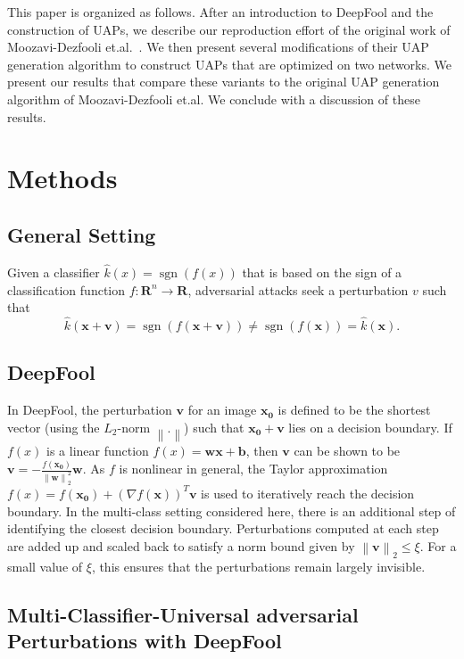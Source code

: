 \documentclass[runningheads]{llncs}
\DeclareMathOperator{\sgn}{sgn}
\newcommand{\xn}{\ensuremath{\mathbf{x_0}}}
\begin{document}
This paper is organized as follows. After an introduction to DeepFool and the construction of UAPs, we describe our reproduction effort of the original work of Moozavi-Dezfooli et.al.~\cite{moosavi-dezfooli_universal_2017}. We then present several modifications of their UAP generation algorithm to construct UAPs that are optimized on two networks. We present our results that compare these variants to the original UAP generation algorithm of Moozavi-Dezfooli et.al. We conclude with a discussion of these results.

\section{Methods}
\subsection{General Setting}
Given a classifier $\hat{k}(x)=\sgn\left(f(x)\right)$ that is based on the sign of a classification function $f:\mathbf{R}^n\rightarrow\mathbf{R}$, adversarial attacks seek a perturbation $v$ such that \[\hat{k}(\mathbf{x}+\mathbf{v})=\sgn\left(f(\mathbf{x}+\mathbf{v})\right)\neq \sgn\left(f(\mathbf{x})\right)=\hat{k}(\mathbf{x}).\] 


\subsection{DeepFool}
In DeepFool, the perturbation $\mathbf{v}$ for an image $\xn$ is defined to be the shortest vector (using the $L_2$-norm $\left\|.\right\|$) such that $\xn+\mathbf{v}$ lies on a decision boundary. 
If $f(x)$ is a linear function $f(x)=\mathbf{w} \mathbf{x}+\mathbf{b}$, then $\mathbf{v}$ can be shown to be $\mathbf{v}=-\frac{f(\xn)}{\left\|\mathbf{w}\right\|_2^2}\mathbf{w}$. As $f$ is nonlinear in general, the Taylor approximation $f(x)=f(\xn)+\left(\nabla f(\mathbf{x})\right)^T\mathbf{v}$ is used to iteratively reach the decision boundary. 
In the multi-class setting considered here, there is an additional step of identifying the closest decision boundary. Perturbations computed at each step are added up and scaled back to satisfy a norm bound given by \(\left\|\mathbf{v}\right\|_2\leq\xi\). For a small value of \(\xi\), this ensures that the perturbations remain largely invisible.


\subsection{Multi-Classifier-Universal adversarial Perturbations with DeepFool}
\end{document}

